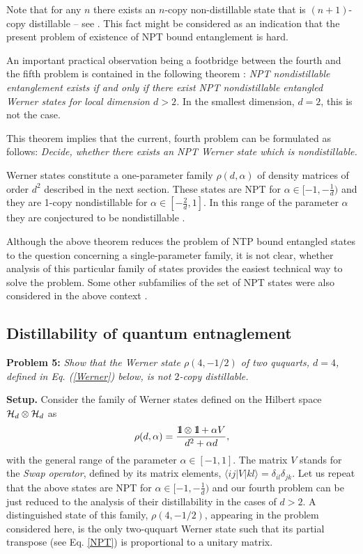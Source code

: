 \documentclass[english,aps,pra,nofootinbib,twocolumn,superscriptaddress]{revtex4-1}
\newcommand{\1}{{\rm 1\hspace{-0.9mm}l}}
\begin{document}
Note that for any $n$ there exists an $n$-copy non-distillable state that is $(n+1)$-copy distillable -- see \cite{Watrous04}. This fact  might be considered as an indication that the present problem of existence of NPT bound entanglement is hard.

  An important practical  observation being a footbridge between the 
 fourth and the fifth problem is contained in the following theorem \cite{HH99}: 
{\it NPT nondistillable entanglement exists if and only if there exist 
NPT nondistillable entangled Werner states for local dimension $d>2$.} 
In the smallest dimension, $d=2$, this is not the case.

This theorem implies that the current, fourth problem can be formulated as follows: 
{\it Decide, whether there exists an NPT Werner state which is nondistillable.} 

Werner states \cite{Werner1989} constitute a one-parameter family $\rho(d,{\alpha})$
of density matrices of order $d^2$  described in the next section. 
These states are NPT for $\alpha \in [-1,-\frac{1}{d})$ and 
 they are 1-copy nondistillable for  $\alpha \in [-\frac{2}{d},1]$.
 In this range of the parameter $\alpha$ 
they are conjectured to be nondistillable \cite{DCLB00,DSSTT00,Clarisse06PhD,Do16,Pankowski2010}.

Although the above theorem reduces the problem of  NTP bound entangled states 
to the question concerning a single-parameter family, it is not clear,
 whether analysis of this particular family of states provides the easiest technical way to solve the problem.
Some other subfamilies of the set of NPT states were also
 considered in the above context \cite{DSSTT00,Watrous04}. 

\subsection{ Distillability of quantum entnaglement}

{\bf Problem 5:} {\sl Show that the Werner state  $\rho(4, -1/2)$ of two ququarts,
$d=4$, defined in Eq. (\ref{Werner}) below, is not $2$-copy distillable.}
\bigskip

{\bf  Setup.} 
Consider the family of Werner states  defined on the Hilbert space $ {\cal H}_d \otimes  {\cal H}_d $
as  
\begin{equation}\label{Werner}
\rho(d,{\alpha})=\frac{\1 \otimes \1 + \alpha V}{d^{2} + \alpha d},
\end{equation}
 with 
the general range of the parameter  $\alpha \in [-1,1]$. The matrix $V$ stands for 
the {\it Swap operator}, defined by its matrix elements, 
 $\langle i j | V | k l \rangle= \delta_{i l} \delta_{j k}$. 
 Let us repeat that the above states are NPT for $ \alpha \in [-1, - \frac{1}{d}) $ and our fourth problem 
 can be just reduced to the analysis of their distillability in the cases of $d>2$.  
A distinguished state of this family,  $\rho(4, -1/2)$,  appearing in the 
problem considered here, is the only two-ququart Werner state 
such that its partial transpose (see Eq. \ref{NPT}) is proportional to a unitary matrix.
\end{document}
